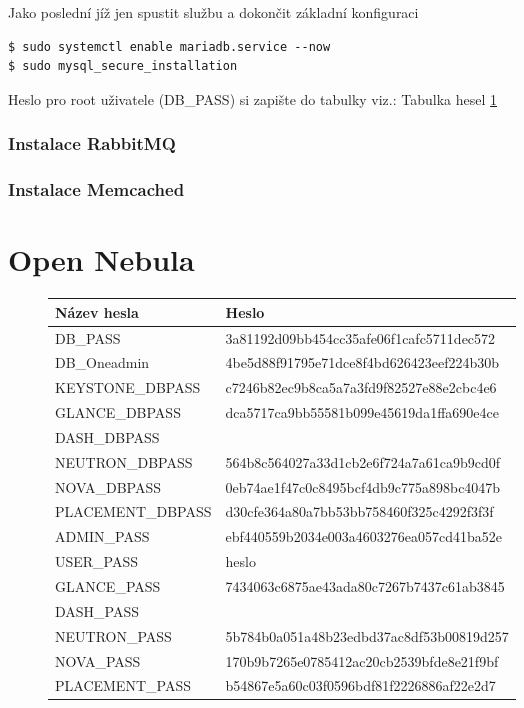 Jako poslední jíž jen spustit službu a dokončit základní konfiguraci

\begin{verbatim}
$ sudo systemctl enable mariadb.service --now
$ sudo mysql_secure_installation
\end{verbatim}

Heslo pro root uživatele (DB\_PASS) si zapište do tabulky viz.: Tabulka hesel \ref{fig:gen-pass-table}

\newpage
\subsubsection{Instalace RabbitMQ}
\subsubsection{Instalace Memcached}

\newpage
\section{Open Nebula}


\begin{figure}[!h]
    \centering
    \begin{tabular}{|l|l|}
    \hline
     \textbf{Název hesla} & \textbf{Heslo} \\
     \hline
     DB\_PASS & 3a81192d09bb454cc35afe06f1cafc5711dec572  \\
     DB\_Oneadmin & 4be5d88f91795e71dce8f4bd626423eef224b30b \\
     KEYSTONE\_DBPASS   & c7246b82ec9b8ca5a7a3fd9f82527e88e2cbc4e6 \\
     GLANCE\_DBPASS     & dca5717ca9bb55581b099e45619da1ffa690e4ce \\
     DASH\_DBPASS       &  \\
     NEUTRON\_DBPASS    & 564b8c564027a33d1cb2e6f724a7a61ca9b9cd0f \\
     NOVA\_DBPASS       & 0eb74ae1f47c0c8495bcf4db9c775a898bc4047b \\
     PLACEMENT\_DBPASS  & d30cfe364a80a7bb53bb758460f325c4292f3f3f \\
     ADMIN\_PASS        & ebf440559b2034e003a4603276ea057cd41ba52e \\
     USER\_PASS         & heslo \\
     GLANCE\_PASS       & 7434063c6875ae43ada80c7267b7437c61ab3845 \\
     DASH\_PASS         &  \\
     NEUTRON\_PASS      & 5b784b0a051a48b23edbd37ac8df53b00819d257 \\
     NOVA\_PASS         & 170b9b7265e0785412ac20cb2539bfde8e21f9bf \\
     PLACEMENT\_PASS    & b54867e5a60c03f0596bdf81f2226886af22e2d7 \\
     \hline
    \end{tabular}
    \label{fig:gen-pass-table}
\end{figure}

